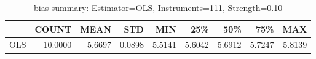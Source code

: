 \begin{table}[ht]
\centering
\caption{bias summary: Estimator=OLS, Instruments=111, Strength=0.10}
\begin{tabular}{lrrrrrrrr}
\toprule
 & COUNT & MEAN & STD & MIN & 25\% & 50\% & 75\% & MAX \\
\midrule
OLS & 10.0000 & 5.6697 & 0.0898 & 5.5141 & 5.6042 & 5.6912 & 5.7247 & 5.8139 \\
\bottomrule
\end{tabular}
\end{table}
